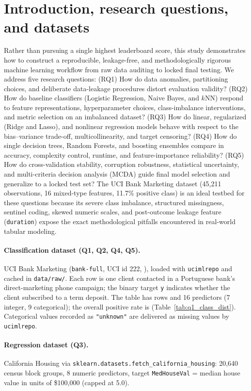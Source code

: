 \section{Introduction, research questions, and datasets}
\label{sec:intro}

Rather than pursuing a single highest leaderboard score, this study demonstrates how to construct a reproducible, leakage-free, and methodologically rigorous machine learning workflow from raw data auditing to locked final testing. We address five research questions: (RQ1) How do data anomalies, partitioning choices, and deliberate data-leakage procedures distort evaluation validity? (RQ2) How do baseline classifiers (Logistic Regression, Naive Bayes, and $k$NN) respond to feature representations, hyperparameter choices, class-imbalance interventions, and metric selection on an imbalanced dataset? (RQ3) How do linear, regularized (Ridge and Lasso), and nonlinear regression models behave with respect to the bias--variance trade-off, multicollinearity, and target censoring? (RQ4) How do single decision trees, Random Forests, and boosting ensembles compare in accuracy, complexity control, runtime, and feature-importance reliability? (RQ5) How do cross-validation stability, corruption robustness, statistical uncertainty, and multi-criteria decision analysis (MCDA) guide final model selection and generalize to a locked test set? The UCI Bank Marketing dataset (45,211 observations, 16 mixed-type features, 11.7\% positive class) is an ideal testbed for these questions because its severe class imbalance, structured missingness, sentinel coding, skewed numeric scales, and post-outcome leakage feature (\texttt{duration}) expose the exact methodological pitfalls encountered in real-world tabular modeling.

\paragraph{Classification dataset (Q1, Q2, Q4, Q5).}
UCI Bank Marketing (\texttt{bank-full}, UCI id 222, \cite{moro2014bank}), loaded with \texttt{ucimlrepo} and cached in
\texttt{data/raw/}. Each row is one client contacted in a Portuguese bank's direct-marketing phone campaign; the
binary target \texttt{y} indicates whether the client subscribed to a term deposit. The table has \NTotal{} rows
and 16 predictors (7 integer, 9 categorical); the overall positive rate is \PosRate{}
(Table~\ref{tab:q1_class_dist}). Categorical values recorded as \texttt{"unknown"} are delivered as missing
values by \texttt{ucimlrepo}.

\paragraph{Regression dataset (Q3).}
California Housing \cite{pace1997sparse} via \nolinkurl{sklearn.datasets.fetch_california_housing}: 20{,}640
census block groups, 8 numeric predictors, target \texttt{MedHouseVal} = median house value in units of
\$100{,}000 (capped at 5.0).
